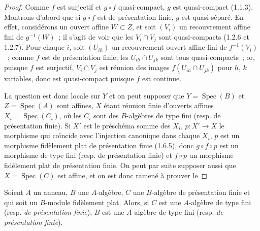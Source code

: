 \begin{proof}
Comme $f$ est surjectif et $g\circ f$ quasi-compact, $g$ est quasi-compact
(1.1.3). Montrons d'abord que si $g\circ f$ est de présentation finie, $g$ est
quasi-séparé. En effet, considérons un ouvert affine $W\subset Z$, et soit
$(V_i)$ un recouvrement affine fini de $g^{-1}(W)$~; il s'agit de voir que les
$V_i\cap V_j$ sont quasi-compacts (1.2.6 et 1.2.7). Pour chaque $i$, soit
$(U_{ih})$ un recouvrement ouvert affine fini de $f^{-1}(V_i)$~; comme $f$ est
de présentation finie, les $U_{ih}\cap U_{jk}$ sont tous quasi-compacts~; or,
puisque $f$ est surjectif, $V_i\cap V_j$ est réunion des images
$f(U_{ih}\cap U_{jk})$ pour $h$, $k$ variables, donc est quasi-compact puisque
$f$ est continue.

La question est donc locale sur $Y$ et on peut supposer que
$Y=\operatorname{Spec}(B)$ et $Z=\operatorname{Spec}(A)$ sont affines, $X$
étant réunion finie d'ouverts affines $X_i=\operatorname{Spec}(C_i)$, où les
$C_i$ sont des $B$-algèbres de type fini (resp. de présentation finie). Si
$X'$ est le préschéma somme des $X_i$, $p:X'\to X$ le morphisme qui coïncide
avec l'injection canonique dans chaque $X_i$, $p$ est un morphisme fidèlement
plat de présentation finie (1.6.5), donc $g\circ f\circ p$ est un morphisme de
type fini (resp. de présentation finie) et $f\circ p$ un morphisme fidèlement
plat de présentation finie. On peut par suite supposer aussi que
$X=\operatorname{Spec}(C)$ est affine, et on est donc ramené à prouver le
\end{proof}

\begin{corollary}[11.3.17]
\label{IV.11.3.17-fr}
Soient $A$ un anneau, $B$ une $A$-algèbre, $C$ une $B$-algèbre de présentation
finie et qui soit un $B$-module fidèlement plat. Alors, si $C$ est une
$A$-algèbre de type fini \textup{(resp. \emph{de présentation finie})}, $B$ est une
$A$-algèbre de type fini \textup{(resp. \emph{de présentation finie})}.
\end{corollary}

